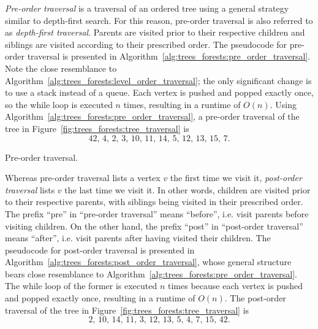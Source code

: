 \emph{Pre-order traversal} is a traversal
of an ordered tree using a general strategy similar to
depth-first search. For this reason,
pre-order traversal is also referred to as
\emph{depth-first traversal}. Parents are visited prior to their
respective children and siblings are visited according to their
prescribed order. The pseudocode for
pre-order traversal is presented in
Algorithm~\ref{alg:trees_forests:pre_order_traversal}. Note the
close resemblance to
Algorithm~\ref{alg:trees_forests:level_order_traversal}; the only
significant change is to use a stack instead of a
queue. Each vertex is pushed and
popped exactly once, so the while loop is executed
$n$ times, resulting in a runtime of $O(n)$. Using
Algorithm~\ref{alg:trees_forests:pre_order_traversal}, a
pre-order traversal of the tree in
Figure~\ref{fig:trees_forests:tree_traversal} is
\[
42,\, 4,\, 2,\, 3,\, 10,\, 11,\, 14,\, 5,\, 12,\, 13,\, 15,\, 7.
\]

\begin{algorithm}[!htbp]

\caption{Pre-order traversal.}
\label{alg:trees_forests:pre_order_traversal}
\end{algorithm}

Whereas pre-order traversal lists a vertex $v$ the first time we visit
it, \emph{post-order traversal} lists $v$
the last time we visit it. In other words, children are visited prior
to their respective parents, with siblings being visited in their
prescribed order. The prefix ``pre'' in ``pre-order traversal'' means
``before'', i.e. visit parents before visiting children. On the other
hand, the prefix ``post'' in ``post-order traversal'' means ``after'',
i.e. visit parents after having visited their children. The pseudocode
for post-order traversal is presented in
Algorithm~\ref{alg:trees_forests:post_order_traversal}, whose general
structure bears close resemblance to
Algorithm~\ref{alg:trees_forests:pre_order_traversal}. The while loop
of the former is executed $n$ times because each vertex is
pushed and popped exactly once,
resulting in a runtime of $O(n)$. The
post-order traversal of the tree in
Figure~\ref{fig:trees_forests:tree_traversal} is
\[
2,\, 10,\, 14,\, 11,\, 3,\, 12,\, 13,\, 5,\, 4,\, 7,\, 15,\, 42.
\]

